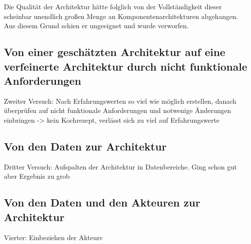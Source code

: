 Die Qualität der Architektur hätte folglich von der Vollständigkeit dieser scheinbar unendlich großen Menge an Komponentenarchitekturen abgehangen. Aus diesem Grund schien er ungeeignet und wurde verworfen.

\subsection{Von einer geschätzten Architektur auf eine verfeinerte Architektur durch nicht funktionale Anforderungen}
Zweiter Versuch: Nach Erfahrungswerten so viel wie möglich erstellen, danach überprüfen auf nicht funktionale Anforderungen und notwenige Änderungen einbringen -> kein Kochrezept, verlässt sich zu viel auf Erfahrungswerte
\subsection{Von den Daten zur Architektur}
Dritter Versuch: Aufspalten der Architektur in Datenbereiche. Ging schon gut aber Ergebnis zu grob
\subsection{Von den Daten und den Akteuren zur Architektur}
Vierter: Einbeziehen der Akteure
